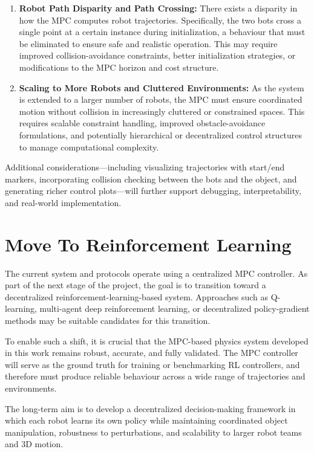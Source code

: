 \documentclass[12pt,english]{report}
\begin{document}
\begin{enumerate}
    \item \textbf{Robot Path Disparity and Path Crossing:}
    There exists a disparity in how the MPC computes robot trajectories. Specifically, the two bots cross a single point at a certain instance during initialization, a behaviour that must be eliminated to ensure safe and realistic operation. This may require improved collision-avoidance constraints, better initialization strategies, or modifications to the MPC horizon and cost structure.

    \item \textbf{Scaling to More Robots and Cluttered Environments:}
    As the system is extended to a larger number of robots, the MPC must ensure coordinated motion without collision in increasingly cluttered or constrained spaces. This requires scalable constraint handling, improved obstacle-avoidance formulations, and potentially hierarchical or decentralized control structures to manage computational complexity.
\end{enumerate}

Additional considerations---including visualizing trajectories with start/end markers, incorporating collision checking between the bots and the object, and generating richer control plots---will further support debugging, interpretability, and real-world implementation.


\section*{Move To Reinforcement Learning}

The current system and protocols operate using a centralized MPC controller. As part of the next stage of the project, the goal is to transition toward a decentralized reinforcement-learning-based system. Approaches such as Q-learning, multi-agent deep reinforcement learning, or decentralized policy-gradient methods may be suitable candidates for this transition.

To enable such a shift, it is crucial that the MPC-based physics system developed in this work remains robust, accurate, and fully validated. The MPC controller will serve as the ground truth for training or benchmarking RL controllers, and therefore must produce reliable behaviour across a wide range of trajectories and environments.

The long-term aim is to develop a decentralized decision-making framework in which each robot learns its own policy while maintaining coordinated object manipulation, robustness to perturbations, and scalability to larger robot teams and 3D motion.
\end{document}
